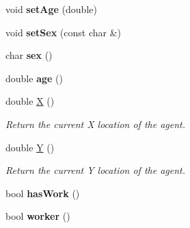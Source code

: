\begin{DoxyCompactItemize}
void {\bfseries set\+Age} (double)
\item 
\mbox{\label{classagent_aaeb64899916c47b42bfdfbc43427d9a8}} 
void {\bfseries set\+Sex} (const char \&)
\item 
\mbox{\label{classagent_a0c0cbe17943c2fc044905fe877b14ade}} 
char {\bfseries sex} ()
\item 
\mbox{\label{classagent_a1f8475f933cfae0199d73c108faff1ad}} 
double {\bfseries age} ()
\item 
double \mbox{\hyperlink{classagent_a312bd1aeb3c660f43bb3bf5a8f0764e7}{X}} ()
\begin{DoxyCompactList}\small\item\em Return the current X location of the agent. \end{DoxyCompactList}\item 
double \mbox{\hyperlink{classagent_a56b8ea7b9138c5e4b92530d454e247ad}{Y}} ()
\begin{DoxyCompactList}\small\item\em Return the current Y location of the agent. \end{DoxyCompactList}\item 
\mbox{\label{classagent_a5d5e7089351107f21f00c73e342feb59}} 
bool {\bfseries has\+Work} ()
\item 
\mbox{\label{classagent_abcfbb2865a7cb599df7a6c5cbff2ce05}} 
bool {\bfseries worker} ()
\end{DoxyCompactItemize}
